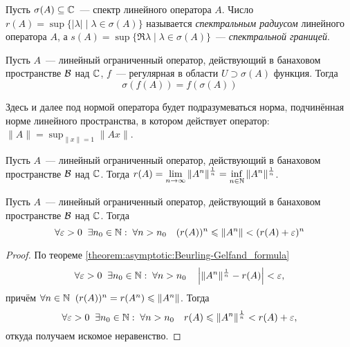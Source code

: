 \begin{definition}
    \label{definition:asymptotic:spectral_radius_and_abscissa}
    Пусть $ \sigma(A) \subseteq \mathbb{C} $~--- спектр линейного оператора $ A $.
    Число $ \displaystyle r(A) = \sup \{|\lambda| \mid \lambda \in \sigma(A) \} $ называется \emph{спектральным радиусом} линейного оператора $ A $,
    а $ \displaystyle s(A) = \sup \{\Re \lambda \mid \lambda \in \sigma(A) \} $~--- \emph{спектральной границей}.
\end{definition}

\begin{theorem}
    \label{theorem:asymptotic:spectral_mapping_theorem}
    Пусть $ A $~--- линейный ограниченный оператор, действующий в банаховом пространстве $ \mathcal{B} $ над $ \mathbb{C} $,
    $ f $~--- регулярная в области $ U \supset \sigma(A) $ функция.
    Тогда
    \begin{equation}
        \label{eq:asymptotic:spectral_mapping_theorem}
        \sigma(f(A)) = f(\sigma(A))
    \end{equation}
\end{theorem}

Здесь и далее под нормой оператора будет подразумеваться норма,
подчинённая норме линейного пространства,
в котором действует оператор: $\displaystyle \| A \| = \sup_{\| x \| = 1} \| A x \| $.

\begin{theorem}
    \label{theorem:asymptotic:Beurling-Gelfand_formula}
    Пусть $ A $~--- линейный ограниченный оператор, действующий в банаховом пространстве $ \mathcal{B} $ над $ \mathbb{C} $.
    Тогда $ \displaystyle r(A) = \lim_{n \to \infty} \| A^n \|^{\frac{1}{n}} = \inf_{n \in \mathbb{N}} \| A^n \|^{\frac{1}{n}} $.
\end{theorem}

\begin{corollary}
    \label{corollary:asymptotic:spectral_radius_norm_bounds}
    Пусть $ A $~--- линейный ограниченный оператор, действующий в банаховом пространстве $ \mathcal{B} $ над $ \mathbb{C} $.
    Тогда
    \[
        \forall \varepsilon > 0 \;\; \exists n_0 \in \mathbb{N}: \; \forall n > n_0 \quad (r(A))^n \leqslant \| A^n \| < (r(A) + \varepsilon)^n
    \]
\end{corollary}

\begin{proof}
    По теореме \ref{theorem:asymptotic:Beurling-Gelfand_formula}
    \[
        \forall \varepsilon > 0 \;\; \exists n_0 \in \mathbb{N}: \; \forall n > n_0 \quad \left| \| A^n \|^{\frac{1}{n}} - r(A) \right| < \varepsilon,
    \]
    причём $ \forall n \in \mathbb{N} \;\; (r(A))^n = r(A^n) \leqslant \| A^n \| $.
    Тогда
    \[
        \forall \varepsilon > 0 \;\; \exists n_0 \in \mathbb{N}: \; \forall n > n_0 \quad r(A) \leqslant \| A^n \|^{\frac{1}{n}} < r(A) + \varepsilon,
    \]
    откуда получаем искомое неравенство.
\end{proof}

